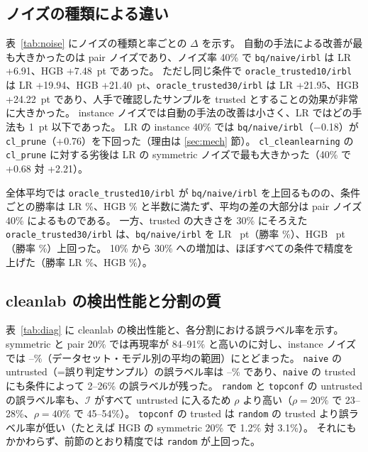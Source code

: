\documentclass[a4paper,10pt]{ltjsarticle}
\newcommand{\method}[1]{\texttt{#1}}
\newcommand{\cl}{\textsf{cleanlab}}
\begin{document}
\subsection{ノイズの種類による違い}
表~\ref{tab:noise} にノイズの種類と率ごとの $\Delta$ を示す。
自動の手法による改善が最も大きかったのは pair ノイズであり、ノイズ率 40\% で \method{bq/naive/irbl} は LR +6.91、HGB +7.48~pt であった。
ただし同じ条件で \method{oracle\_trusted10/irbl} は LR +19.94、HGB +21.40~pt、\method{oracle\_trusted30/irbl} は LR +21.95、HGB +24.22~pt であり、人手で確認したサンプルを trusted とすることの効果が非常に大きかった。
instance ノイズでは自動の手法の改善は小さく、LR ではどの手法も 1~pt 以下であった。
LR の instance 40\% では \method{bq/naive/irbl}（$-$0.18）が \method{cl\_prune}（+0.76）を下回った（理由は \ref{sec:mech} 節）。
\method{cl\_cleanlearning} の \method{cl\_prune} に対する劣後は LR の symmetric ノイズで最も大きかった（40\% で +0.68 対 +2.21）。

全体平均では \method{oracle\_trusted10/irbl} が \method{bq/naive/irbl} を上回るものの、条件ごとの勝率は LR \PLROracleTenVsNaiveIrblWin\%、HGB \PHGBOracleTenVsNaiveIrblWin\% と半数に満たず、平均の差の大部分は pair ノイズ 40\% によるものである。
一方、trusted の大きさを 30\% にそろえた \method{oracle\_trusted30/irbl} は、\method{bq/naive/irbl} を LR \PLROracleThirtyVsNaiveIrbl{}~pt（勝率 \PLROracleThirtyVsNaiveIrblWin\%）、HGB \PHGBOracleThirtyVsNaiveIrbl{}~pt（勝率 \PHGBOracleThirtyVsNaiveIrblWin\%）上回った。
10\% から 30\% への増加は、ほぼすべての条件で精度を上げた（勝率 LR \PLROracleThirtyVsOracleTenWin\%、HGB \PHGBOracleThirtyVsOracleTenWin\%）。

\begin{table}[tbp]
  \centering
  \caption{ノイズの種類と率ごとの $\Delta$（pt、3 データセット $\times$ 5 シードの平均）。主要な手法のみ。先頭行は \method{baseline} の精度（\%）。全手法は付録の表~\ref{tab:noise-all}。}
  \label{tab:noise}
  \footnotesize
  
\end{table}

\subsection{\cl{} の検出性能と分割の質}\label{sec:diag}
表~\ref{tab:diag} に \cl{} の検出性能と、各分割における誤ラベル率を示す。
symmetric と pair 20\% では再現率が 84--91\% と高いのに対し、instance ノイズでは \InstRecallMin--\InstRecallMax\%（データセット・モデル別の平均の範囲）にとどまった。
\method{naive} の untrusted（=誤り判定サンプル）の誤ラベル率は \NaiveUntrustedMin--\NaiveUntrustedMax\% であり、\method{naive} の trusted にも条件によって 2--26\% の誤ラベルが残った。
\method{random} と \method{topconf} の untrusted の誤ラベル率も、$\mathcal{I}$ がすべて untrusted に入るため $\rho$ より高い（$\rho = 20\%$ で 23--28\%、$\rho = 40\%$ で 45--54\%）。
\method{topconf} の trusted は \method{random} の trusted より誤ラベル率が低い（たとえば HGB の symmetric 20\% で 1.2\% 対 3.1\%）。
それにもかかわらず、前節のとおり精度では \method{random} が上回った。
\end{document}

